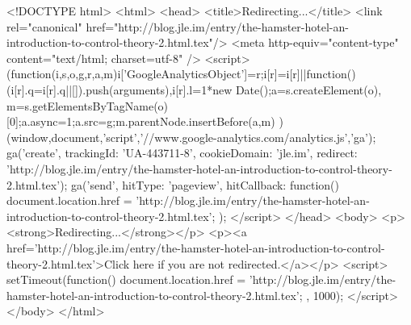<!DOCTYPE html>
<html>
<head>
<title>Redirecting...</title>
<link rel="canonical" href="http://blog.jle.im/entry/the-hamster-hotel-an-introduction-to-control-theory-2.html.tex"/>
<meta http-equiv="content-type" content="text/html; charset=utf-8" />
<script>
(function(i,s,o,g,r,a,m){i['GoogleAnalyticsObject']=r;i[r]=i[r]||function(){
(i[r].q=i[r].q||[]).push(arguments)},i[r].l=1*new Date();a=s.createElement(o),
m=s.getElementsByTagName(o)[0];a.async=1;a.src=g;m.parentNode.insertBefore(a,m)
})(window,document,'script','//www.google-analytics.com/analytics.js','ga');
ga('create', { trackingId: 'UA-443711-8', cookieDomain: 'jle.im', redirect: 'http://blog.jle.im/entry/the-hamster-hotel-an-introduction-to-control-theory-2.html.tex'});
ga('send', { hitType: 'pageview', hitCallback: function() { document.location.href = 'http://blog.jle.im/entry/the-hamster-hotel-an-introduction-to-control-theory-2.html.tex'; } });
</script>
</head>
<body>
  <p><strong>Redirecting...</strong></p>
  <p><a href='http://blog.jle.im/entry/the-hamster-hotel-an-introduction-to-control-theory-2.html.tex'>Click here if you are not redirected.</a></p>
  <script>
    setTimeout(function() { document.location.href = 'http://blog.jle.im/entry/the-hamster-hotel-an-introduction-to-control-theory-2.html.tex'; }, 1000);
  </script>
</body>
</html>
